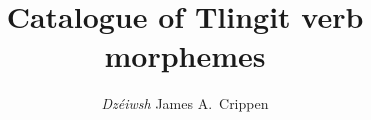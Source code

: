 \documentclass[12pt,letterpaper,oneside,article]{memoir}
\begin{document}
\title{Catalogue of Tlingit verb morphemes}
\author{\textit{Dzéiwsh} James A.\ Crippen}

\maketitle
\tableofcontents*

\clearpage


\clearpage


\clearpage


\clearpage
\raggedyright
\printbibliography\label{sec:bibliography} 
\end{document}
